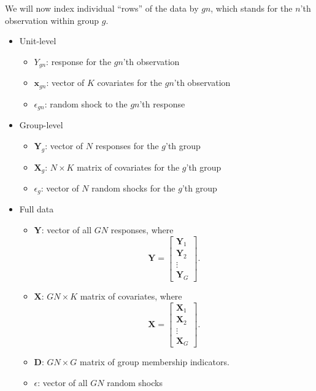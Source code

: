 \documentclass[12pt,oneside,openany]{book}
\providecommand{\tightlist}{%
  \setlength{\itemsep}{0pt}\setlength{\parskip}{0pt}}
\begin{document}
We will now index individual ``rows'' of the data by \(gn\), which
stands for the \(n\)'th observation within group \(g\).

\begin{itemize}
\tightlist
\item
  Unit-level

  \begin{itemize}
  \tightlist
  \item
    \(Y_{gn}\): response for the \(gn\)'th observation
  \item
    \(\mathbf{x}_{gn}\): vector of \(K\) covariates for the \(gn\)'th
    observation
  \item
    \(\epsilon_{gn}\): random shock to the \(gn\)'th response
  \end{itemize}
\item
  Group-level

  \begin{itemize}
  \tightlist
  \item
    \(\mathbf{Y}_g\): vector of \(N\) responses for the \(g\)'th group
  \item
    \(\mathbf{X}_g\): \(N \times K\) matrix of covariates for the
    \(g\)'th group
  \item
    \(\epsilon_g\): vector of \(N\) random shocks for the \(g\)'th group
  \end{itemize}
\item
  Full data

  \begin{itemize}
  \tightlist
  \item
    \(\mathbf{Y}\): vector of all \(GN\) responses, where
    \[\mathbf{Y} = \begin{bmatrix} \mathbf{Y}_1 \\ \mathbf{Y}_2 \\ \vdots \\ \mathbf{Y}_G \end{bmatrix}.\]
  \item
    \(\mathbf{X}\): \(GN \times K\) matrix of covariates, where
    \[\mathbf{X} = \begin{bmatrix} \mathbf{X}_1 \\ \mathbf{X}_2 \\ \vdots \\ \mathbf{X}_G \end{bmatrix}.\]
  \item
    \(\mathbf{D}\): \(GN \times G\) matrix of group membership
    indicators.
  \item
    \(\epsilon\): vector of all \(GN\) random shocks
  \end{itemize}
\end{itemize}
\end{document}
